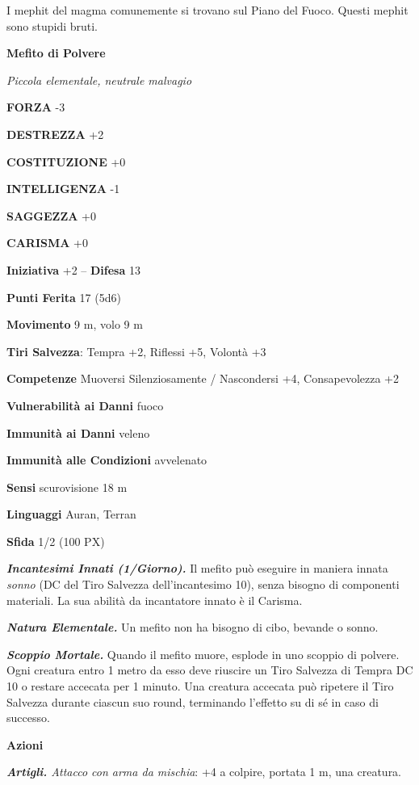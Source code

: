 \begin{multicols}{2}
	I mephit del magma comunemente si trovano sul Piano del Fuoco. Questi mephit sono stupidi bruti.


	\medskip{}\textbf{Mefito di Polvere}

	\textit{Piccola elementale, neutrale malvagio}

	\textbf{FORZA} -3

	\textbf{DESTREZZA} +2

	\textbf{COSTITUZIONE} +0

	\textbf{INTELLIGENZA} -1

	\textbf{SAGGEZZA} +0

	\textbf{CARISMA} +0

	\textbf{Iniziativa} +2 -- \textbf{Difesa} 13

	\textbf{Punti Ferita} 17 (5d6)

	\textbf{Movimento} 9 m, volo 9 m

	\textbf{Tiri Salvezza}: Tempra +2, Riflessi +5, Volontà +3

	\textbf{Competenze} Muoversi Silenziosamente / Nascondersi +4, Consapevolezza +2

	\textbf{Vulnerabilità ai Danni} fuoco

	\textbf{Immunità ai Danni} veleno

	\textbf{Immunità alle Condizioni} avvelenato

	\textbf{Sensi} scurovisione 18 m

	\textbf{Linguaggi} Auran, Terran

	\textbf{Sfida} 1/2 (100 PX)

	\textit{\textbf{Incantesimi Innati (1/Giorno).}} Il mefito può eseguire in maniera innata \textit{sonno} (DC del Tiro Salvezza dell'incantesimo 10), senza bisogno di componenti materiali. La sua abilità da incantatore innato è il Carisma.

	\textit{\textbf{Natura Elementale.}} Un mefito non ha bisogno di cibo, bevande o sonno.

	\textit{\textbf{Scoppio Mortale.}} Quando il mefito muore, esplode in uno scoppio di polvere. Ogni creatura entro 1 metro da esso deve riuscire un Tiro Salvezza di Tempra DC 10 o restare accecata per 1 minuto. Una creatura accecata può ripetere il Tiro Salvezza durante ciascun suo round, terminando l'effetto su di sé in caso di successo.

	\textbf{Azioni}

	\textit{\textbf{Artigli.} Attacco con arma da mischia}: +4 a colpire, portata 1 m, una creatura.


\end{multicols}
